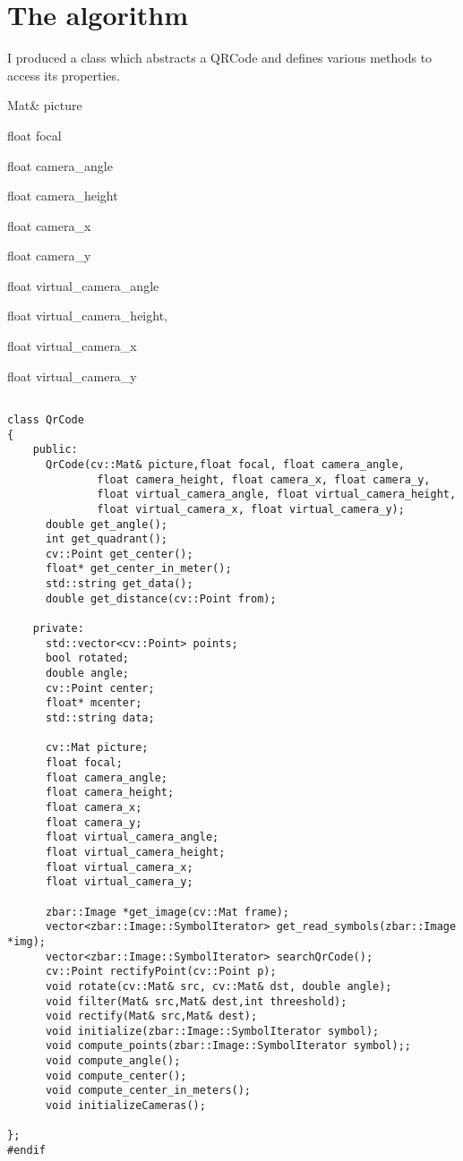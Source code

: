 \chapter{The algorithm}

I produced a class which abstracts a QRCode and defines various methods to access its properties.

\begin{itemize}

\end{itemize}
	\item Mat& picture
	\item float focal
	\item float camera_angle
    \item float camera_height
    \item float camera_x
    \item float camera_y
  	\item float virtual_camera_angle
  	\item float virtual_camera_height,
  	\item float virtual_camera_x
  	\item float virtual_camera_y
\begin{lstlisting}

class QrCode
{
    public:
      QrCode(cv::Mat& picture,float focal, float camera_angle,
              float camera_height, float camera_x, float camera_y,
              float virtual_camera_angle, float virtual_camera_height,
              float virtual_camera_x, float virtual_camera_y);
      double get_angle();
      int get_quadrant();
      cv::Point get_center();
      float* get_center_in_meter();
      std::string get_data();
      double get_distance(cv::Point from);

    private:
      std::vector<cv::Point> points;
      bool rotated;
      double angle;
      cv::Point center;
      float* mcenter;
      std::string data;

      cv::Mat picture;
      float focal;
      float camera_angle;
      float camera_height;
      float camera_x;
      float camera_y;
      float virtual_camera_angle;
      float virtual_camera_height;
      float virtual_camera_x; 
      float virtual_camera_y;
      
      zbar::Image *get_image(cv::Mat frame);
      vector<zbar::Image::SymbolIterator> get_read_symbols(zbar::Image *img);
      vector<zbar::Image::SymbolIterator> searchQrCode();
      cv::Point rectifyPoint(cv::Point p);
      void rotate(cv::Mat& src, cv::Mat& dst, double angle);
      void filter(Mat& src,Mat& dest,int threeshold);
      void rectify(Mat& src,Mat& dest);
      void initialize(zbar::Image::SymbolIterator symbol);
      void compute_points(zbar::Image::SymbolIterator symbol);;
      void compute_angle();
      void compute_center();
      void compute_center_in_meters();
      void initializeCameras();
      
};
#endif
\end{lstlisting}